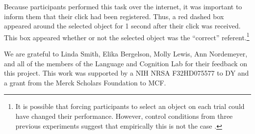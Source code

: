 \documentclass{pnastwo}
\begin{document}
\begin{article}
\begin{materials}
Because participants performed this task over the internet, it was important to inform them that their click had been registered. Thus, a red dashed box appeared around the selected object for 1 second after their click was received. This box appeared  whether or not the selected object was the ``correct'' referent.\footnote{It is possible that forcing participants to select an object on each trial could have changed their performance. However, control conditions from three previous experiments suggest that empirically this is not the case \citep{Medina2011, Smith2011a, Trueswell2013}.}

\end{materials}

\begin{acknowledgments}
We are grateful to Linda Smith, Elika Bergelson, Molly Lewis, Ann Nordemeyer, and all of the members of the Language and Cognition Lab for their feedback on this project. This work was supported by a NIH NRSA F32HD075577 to DY and a grant from the Merck Scholars Foundation to MCF.
\end{acknowledgments}




\end{article}
\end{document}
